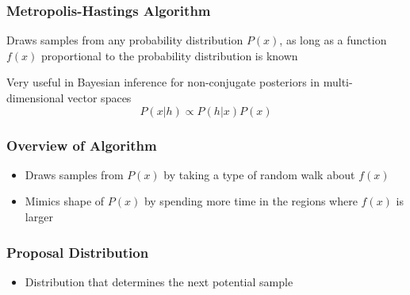 \begin{frame}
  \frametitle{Metropolis-Hastings Algorithm}
  \begin{center}
    Draws samples from any probability distribution $P(x)$, as long as a
    function $f(x)$ proportional to the probability distribution is known
    \vspace{4em}

    Very useful in Bayesian inference for non-conjugate posteriors in
    multi-dimensional vector spaces
    \[P(x|h) \propto P(h|x) P(x)\]
  \end{center}
\end{frame}

\begin{frame}
  \frametitle{Overview of Algorithm}
  \begin{itemize}
  \item Draws samples from $P(x)$ by taking a type of random walk about $f(x)$
  \item Mimics shape of $P(x)$ by spending more time in the regions where $f(x)$
    is larger
  \end{itemize}
\end{frame}

\begin{frame}
  \frametitle{Proposal Distribution}
  \begin{itemize}
  \item Distribution that determines the next potential sample
  \end{itemize}
\end{frame}
